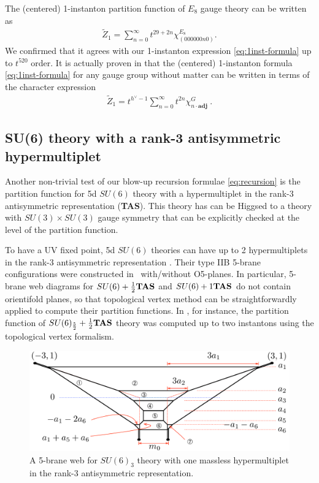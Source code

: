\documentclass[letterpaper, 11pt]{article}
\begin{document}
{The (centered) 1-instanton partition function of $E_8$ gauge theory can be written as 
\begin{align}
    \label{eq:E8}
  \tilde{Z}_1=\sum_{n=0}^{\infty}t^{29+2n}\chi^{E_8}_{(000000n0)}.
\end{align}
We confirmed that it agrees with our 1-instanton expression \eqref{eq:1inst-formula} up to $t^{520}$ order. 
It is actually proven in \cite{Keller:2011ek, Keller:2012da} that the (centered) 1-instanton formula \eqref{eq:1inst-formula} for any gauge group without matter can be written in terms of the character expression \cite{VinbergPopov, Garfinkle, Benvenuti:2010pq}
\begin{align}
 \tilde{Z}_1 = t^{h^\vee - 1} \sum_{n=0}^\infty t^{2n} \chi^G_{n \cdot \textbf{adj}} \ . 
\end{align}


\subsection{SU(6) theory with a rank-3 antisymmetric hypermultiplet}
\label{subsec:rank3}
Another non-trivial test of our blow-up recursion formulae \eqref{eq:recursion}  is the partition function for 5d $SU(6)$ theory with a hypermultiplet in the rank-3 antisymmetric representation ({\bf TAS}). This theory has can be Higgsed to a theory with $SU(3)\times SU(3)$ gauge symmetry that can be explicitly checked at the level of the partition function.

To have a UV fixed point, 5d $SU(6)$ theories can have up to 2 hypermultiplets in the rank-3 antisymmetric representation \cite{Jefferson:2017ahm}. Their type IIB 5-brane configurations were constructed in~\cite{Hayashi:2019yxj} with/without O5-planes. In particular, 5-brane web diagrams for $SU(6)+\frac12{\bf TAS}$ and $SU(6)+1{\bf TAS}$ do not contain orientifold planes, so that topological vertex method \cite{Aganagic:2003db, Iqbal:2007ii} can be straightforwardly applied to compute their partition functions. In \cite{Hayashi:2019yxj},  for instance, the partition function of $SU(6)_\frac52 + \frac12{\bf TAS}$ theory was computed up to two instantons using the topological vertex formalism.
\begin{figure}[t]
\centering
\includegraphics[width=12cm]{SU6-monopole.pdf}
\caption{A 5-brane web for $SU(6)_3$ theory with one massless hypermultiplet in the rank-3 antisymmetric representation.}
\label{fig:SU6-monopole}
\end{figure}

}
\end{document}
